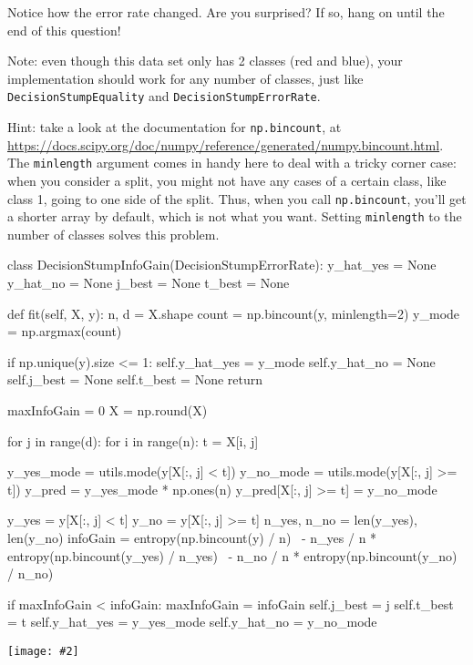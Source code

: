\documentclass{article}
\newcommand{\centerfig}[2]{\begin{center}\texttt{[image: \#2]}\end{center}}
\begin{document}
    Notice how the error rate changed. Are you surprised? If so, hang on until the end of this question!

    Note: even though this data set only has 2 classes (red and blue), your implementation should work
    for any number of classes, just like \texttt{DecisionStumpEquality} and \texttt{DecisionStumpErrorRate}.

    Hint: take a look at the documentation for \texttt{np.bincount}, at \\
    \url{https://docs.scipy.org/doc/numpy/reference/generated/numpy.bincount.html}.
    The \texttt{minlength} argument comes in handy here to deal with a tricky corner case:
    when you consider a split, you might not have any cases of a certain class, like class 1,
    going to one side of the split. Thus, when you call \texttt{np.bincount}, you'll get
    a shorter array by default, which is not what you want. Setting \texttt{minlength} to the
    number of classes solves this problem.

        \begin{python}
class DecisionStumpInfoGain(DecisionStumpErrorRate):
    y_hat_yes = None
    y_hat_no = None
    j_best = None
    t_best = None

    def fit(self, X, y):
        n, d = X.shape
        count = np.bincount(y, minlength=2)
        y_mode = np.argmax(count)

        if np.unique(y).size <= 1:
            self.y_hat_yes = y_mode
            self.y_hat_no = None
            self.j_best = None
            self.t_best = None
            return

        maxInfoGain = 0
        X = np.round(X)

        for j in range(d):
            for i in range(n):
                t = X[i, j]

                y_yes_mode = utils.mode(y[X[:, j] < t])
                y_no_mode = utils.mode(y[X[:, j] >= t])
                y_pred = y_yes_mode * np.ones(n)
                y_pred[X[:, j] >= t] = y_no_mode

                y_yes = y[X[:, j] < t]
                y_no = y[X[:, j] >= t]
                n_yes, n_no = len(y_yes), len(y_no)
                infoGain = entropy(np.bincount(y) / n) \
                           - n_yes / n * entropy(np.bincount(y_yes) / n_yes) \
                           - n_no / n * entropy(np.bincount(y_no) / n_no)

                if maxInfoGain < infoGain:
                    maxInfoGain = infoGain
                    self.j_best = j
                    self.t_best = t
                    self.y_hat_yes = y_yes_mode
                    self.y_hat_no = y_no_mode
    \end{python}
    \centerfig{0.7}{../figs/q6_3_decisionBoundary}
\end{document}
